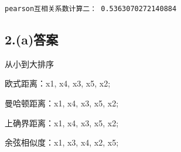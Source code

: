 \documentclass[11pt]{article}
\begin{document}
    \begin{Verbatim}[commandchars=\\\{\}]
pearson互相关系数计算二： 0.5363070272140884

    \end{Verbatim}

    \hypertarget{aux7b54ux6848}{%
\subsection{2.(a)答案}\label{aux7b54ux6848}}

从小到大排序

欧式距离：x1, x4, x3, x5, x2;

曼哈顿距离：x1, x4, x3, x5, x2;

上确界距离：x1, x4, x3, x5, x2;

余弦相似度：x1, x3, x4, x2, x5;
\end{document}
